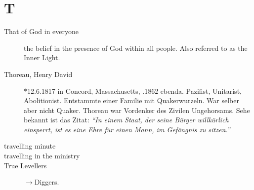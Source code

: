 \section*{T}

\articlesize

\begin{description}

 \item[That of God in everyone]
    the belief in the presence of God within all people. Also referred to as the Inner Light.
    
 \item[Thoreau, Henry David] $\ast$12.6.1817 in Concord, Massachusetts, .1862 ebenda. Pazifist, Unitarist, Abolitionist. Entstammte einer Familie mit Quakerwurzeln. War selber aber nicht Quaker. Thoreau war Vordenker des Zivilen Ungehorsams. Sehe bekannt ist das Zitat: \textit{"`In einem Staat, der seine Bürger willkürlich einsperrt, ist es eine Ehre für einen Mann, im Gefängnis zu sitzen."'}


 \item[travelling minute]

 \item[travelling in the ministry]

 \item[True Levellers] $\to$Diggers.

 \end{description}

\normalsize
